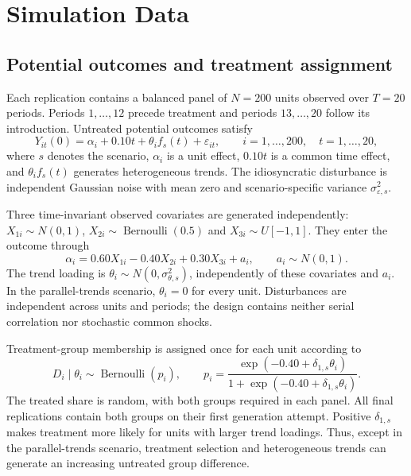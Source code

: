 \documentclass[11pt,a4paper]{article}
\begin{document}
\section{Simulation Data}\label{sec:data}
\subsection{Potential outcomes and treatment assignment}
Each replication contains a balanced panel of $N=200$ units observed over $T=20$ periods. Periods $1,\ldots,12$ precede treatment and periods $13,\ldots,20$ follow its introduction. Untreated potential outcomes satisfy
\begin{equation}\label{eq:dgp}
Y_{it}(0)=\alpha_i+0.10t+\theta_i f_s(t)+\varepsilon_{it},
\qquad i=1,\ldots,200,\quad t=1,\ldots,20,
\end{equation}
where $s$ denotes the scenario, $\alpha_i$ is a unit effect, $0.10t$ is a common time effect, and $\theta_i f_s(t)$ generates heterogeneous trends. The idiosyncratic disturbance is independent Gaussian noise with mean zero and scenario-specific variance $\sigma_{\varepsilon,s}^{2}$.

Three time-invariant observed covariates are generated independently: $X_{1i}\sim N(0,1)$, $X_{2i}\sim\operatorname{Bernoulli}(0.5)$ and $X_{3i}\sim U[-1,1]$. They enter the outcome through
\begin{equation}\label{eq:alpha}
\alpha_i=0.60X_{1i}-0.40X_{2i}+0.30X_{3i}+a_i,
\qquad a_i\sim N(0,1).
\end{equation}
The trend loading is $\theta_i\sim N(0,\sigma_{\theta,s}^{2})$, independently of these covariates and $a_i$. In the parallel-trends scenario, $\theta_i=0$ for every unit. Disturbances are independent across units and periods; the design contains neither serial correlation nor stochastic common shocks.

Treatment-group membership is assigned once for each unit according to
\begin{equation}\label{eq:assignment}
D_i\mid\theta_i\sim\operatorname{Bernoulli}(p_i),
\qquad p_i=\frac{\exp(-0.40+\delta_{1,s}\theta_i)}{1+\exp(-0.40+\delta_{1,s}\theta_i)}.
\end{equation}
The treated share is random, with both groups required in each panel. All final replications contain both groups on their first generation attempt. Positive $\delta_{1,s}$ makes treatment more likely for units with larger trend loadings. Thus, except in the parallel-trends scenario, treatment selection and heterogeneous trends can generate an increasing untreated group difference.
\end{document}

